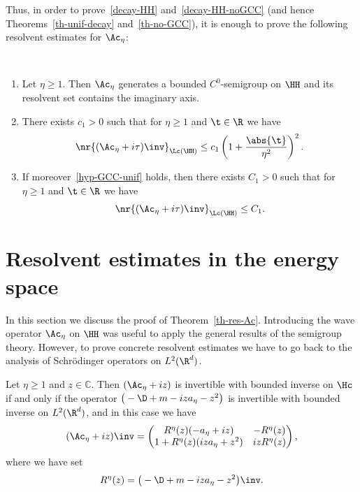 Thus, in order to prove~\eqref{decay-HH} and~\eqref{decay-HH-noGCC} (and hence Theorems~\ref{th-unif-decay} and~\ref{th-no-GCC}), it is enough to prove the following resolvent estimates for $\Ac_\eta$:

\let\oldpointir\pointir
\renewcommand{\pointir}{}
\begin{theo}\label{th-res-Ac}\ 
\begin{enumerate}%
\item Let $\eta \geq 1$. Then $\Ac_\eta$ generates a bounded $C^0$-semigroup on $\HH$ and its resolvent set contains the imaginary axis.
\item There exists $c_1 > 0$ such that for $\eta \geq 1$ and $\t \in \R$ we have
\[
\nr{(\Ac_\eta + i\tau)\inv}_{\Lc(\HH)} \leq c_1 \left(1+\frac {\abs{\t}}{\eta^2} \right)^2.
\]
\item If moreover~\eqref{hyp-GCC-unif} holds, then there exists $C_1 > 0$ such that for $\eta \geq 1$ and $\t \in \R$ we have
\[
\nr{(\Ac_\eta + i\tau)\inv}_{\Lc(\HH)} \leq C_1.
\]
\end{enumerate}
\end{theo}
\let\pointir\oldpointir

\section{Resolvent estimates in the energy space} \label{sec-res-from-L2-to-Hc}

In this section we discuss the proof of Theorem~\ref{th-res-Ac}. Introducing the wave operator $\Ac_\eta$ on $\HH$ was useful to apply the general results of the semigroup theory. However, to prove concrete resolvent estimates we have to go back to the analysis of Schr\"odinger operators on $L^2(\R^d)$.

\begin{prop}\label{prop-res-Ac-Rz}
Let $\eta \geq 1$ and $z \in \mathbb C$. Then $(\Ac_\eta +iz)$ is invertible with bounded inverse on $\Hc$ if and only if the operator $ {\big(-\D + m -iza_\eta -z^2\big)} $ is invertible with bounded inverse on $L^2(\R^d)$, and in this case we have
\begin{equation}\label{expr-res-Ac}
(\Ac_\eta +iz)\inv =
\begin{pmatrix}
R^\eta(z) (-a_\eta + iz) & -R^\eta(z) \\
1 + R^\eta(z) (iz a_\eta+z^2) & i z R^\eta(z)
\end{pmatrix},
\end{equation}
where we have set
\[
R^\eta(z) = \big(-\D + m -iza_\eta -z^2\big)\inv.
\]
\end{prop}


